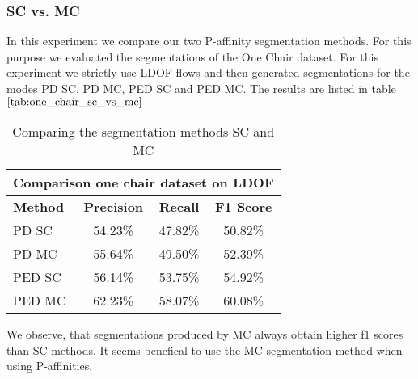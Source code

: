 \subsubsection{SC vs. MC}
In this experiment we compare our two P-affinity segmentation methods. For this purpose we evaluated the segmentations of the One Chair dataset. For this experiment we strictly use LDOF flows and then generated segmentations for the modes PD SC, PD MC, PED SC and PED MC. The results are listed in table $\ref{tab:one_chair_sc_vs_mc}$
\begin{table}[H]
\centering
\begin{tabular}{|l|c|c|c|}
\hline
\multicolumn{4}{|c|}{Comparison one chair dataset on LDOF}                        \\ \hline
\textbf{Method} & \textbf{Precision} & \textbf{Recall} & \textbf{F1 Score}  \\ \hline
PD SC & 54.23\% & 47.82\% & 50.82\% \\ \hline
PD MC & 55.64\% & 49.50\% & 52.39\% \\ \hline
PED SC & 56.14\% & 53.75\% & 54.92\% \\ \hline
PED MC & 62.23\% & 58.07\% & 60.08\% \\ \hline              
\end{tabular}
\caption[SC vs. MC]{Comparing the segmentation methods SC and MC} 
\label{tab:one_chair_sc_vs_mc}
\end{table}
We observe, that segmentations produced by MC always obtain higher f1 scores than SC methods. It seems benefical to use the MC segmentation method when using P-affinities.


